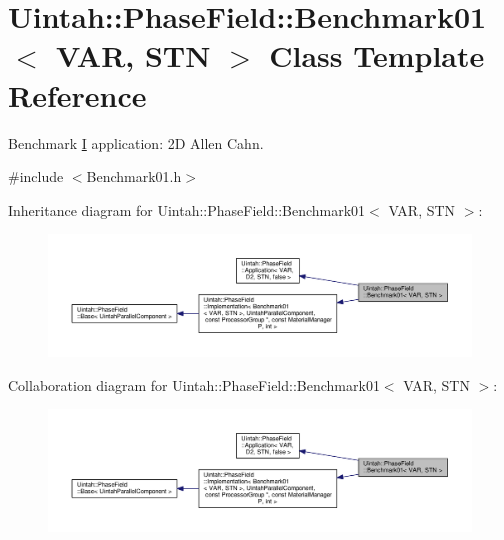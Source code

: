 \hypertarget{classUintah_1_1PhaseField_1_1Benchmark01}{}\section{Uintah\+:\+:Phase\+Field\+:\+:Benchmark01$<$ V\+AR, S\+TN $>$ Class Template Reference}
\label{classUintah_1_1PhaseField_1_1Benchmark01}


Benchmark \hyperlink{structUintah_1_1PhaseField_1_1I}{I} application\+: 2D Allen Cahn.  




{\ttfamily \#include $<$Benchmark01.\+h$>$}



Inheritance diagram for Uintah\+:\+:Phase\+Field\+:\+:Benchmark01$<$ V\+AR, S\+TN $>$\+:\nopagebreak
\begin{figure}[H]
\begin{center}
\leavevmode
\includegraphics[width=350pt]{classUintah_1_1PhaseField_1_1Benchmark01__inherit__graph}
\end{center}
\end{figure}


Collaboration diagram for Uintah\+:\+:Phase\+Field\+:\+:Benchmark01$<$ V\+AR, S\+TN $>$\+:\nopagebreak
\begin{figure}[H]
\begin{center}
\leavevmode
\includegraphics[width=350pt]{classUintah_1_1PhaseField_1_1Benchmark01__coll__graph}
\end{center}
\end{figure}

